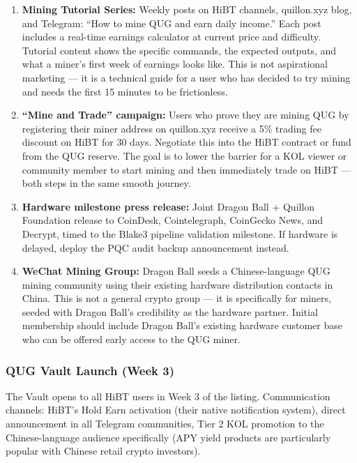 \documentclass[11pt,a4paper]{article}
\begin{document}
\begin{enumerate}[leftmargin=1.5em]
  \item \textbf{Mining Tutorial Series:} Weekly posts on HiBT channels, quillon.xyz blog, and Telegram: ``How to mine QUG and earn daily income.'' Each post includes a real-time earnings calculator at current price and difficulty. Tutorial content shows the specific commands, the expected outputs, and what a miner's first week of earnings looks like. This is not aspirational marketing — it is a technical guide for a user who has decided to try mining and needs the first 15 minutes to be frictionless.

  \item \textbf{``Mine and Trade'' campaign:} Users who prove they are mining QUG by registering their miner address on quillon.xyz receive a 5\% trading fee discount on HiBT for 30 days. Negotiate this into the HiBT contract or fund from the QUG reserve. The goal is to lower the barrier for a KOL viewer or community member to start mining and then immediately trade on HiBT — both steps in the same smooth journey.

  \item \textbf{Hardware milestone press release:} Joint Dragon Ball + Quillon Foundation release to CoinDesk, Cointelegraph, CoinGecko News, and Decrypt, timed to the Blake3 pipeline validation milestone. If hardware is delayed, deploy the PQC audit backup announcement instead.

  \item \textbf{WeChat Mining Group:} Dragon Ball seeds a Chinese-language QUG mining community using their existing hardware distribution contacts in China. This is not a general crypto group — it is specifically for miners, seeded with Dragon Ball's credibility as the hardware partner. Initial membership should include Dragon Ball's existing hardware customer base who can be offered early access to the QUG miner.
\end{enumerate}

\subsubsection{QUG Vault Launch (Week 3)}

The Vault opens to all HiBT users in Week 3 of the listing. Communication channels: HiBT's Hold Earn activation (their native notification system), direct announcement in all Telegram communities, Tier 2 KOL promotion to the Chinese-language audience specifically (APY yield products are particularly popular with Chinese retail crypto investors).
\end{document}
